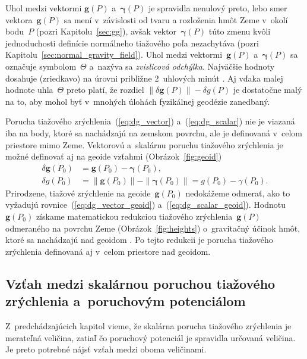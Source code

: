 \documentclass[a4paper, 12pt]{book}
\let\vec\mathbf
\begin{document}
Uhol medzi vektormi $\vec g(P)$ a~$\boldsymbol{\gamma}(P)$ je spravidla 
nenulový preto, lebo smer vektora~$\vec g(P)$ sa mení v~závislosti od tvaru 
a rozloženia hmôt Zeme v~okolí bodu~$P$ (pozri Kapitolu~\ref{sec:gg}), avšak 
vektor~$\boldsymbol \gamma(P)$ túto zmenu kvôli jednoduchosti definície 
normálneho tiažového poľa nezachytáva (pozri 
Kapitolu~\ref{sec:normal_gravity_field}).  Uhol medzi vektormi~$\vec g(P)$ 
a~$\boldsymbol \gamma(P)$ sa označuje symbolom~$\Theta$ a~nazýva sa 
\emph{zvislicová odchýlka}.  Najväčšie hodnoty dosahuje (zriedkavo) na úrovni 
približne 2~uhlových minút \parencite{GGMplus}.  Aj vďaka malej hodnote 
uhla~$\Theta$ preto platí, že rozdiel $\| \delta \vec g(P) \| - \delta g(P)$ je 
dostatočne malý na to, aby mohol byť v~mnohých úlohách fyzikálnej geodézie 
zanedbaný.

Porucha tiažového zrýchlenia~(\ref{eq:dg_vector}) a~(\ref{eq:dg_scalar}) nie je 
viazaná iba na body, ktoré sa nachádzajú na zemskom povrchu, ale je definovaná 
v~celom priestore mimo Zeme.  Vektorovú a~skalárnu poruchu tiažového zrýchlenia 
je možné definovať aj na geoide vzťahmi (Obrázok~\ref{fig:geoid})
%
\begin{align}
\label{eq:dg_vector_geoid}
\delta \vec g(P_0) &= \vec g(P_0) - \boldsymbol \gamma(P_0){,}\\
%
\label{eq:dg_scalar_geoid}
\delta g(P_0) &= \| \vec g(P_0) \| - \| \boldsymbol \gamma(P_0) \| = g(P_0) 
- \gamma(P_0){.}
\end{align}
%
Prirodzene, tiažové zrýchlenie na geoide~$\vec g(P_0)$ nedokážeme odmerať, ako 
to vyžadujú rovnice~(\ref{eq:dg_vector_geoid}) a~(\ref{eq:dg_scalar_geoid}).  
Hodnotu~$\vec g(P_0)$ získame matematickou redukciou tiažového zrýchlenia~$\vec 
g(P)$ odmeraného na povrchu Zeme (Obrázok~\ref{fig:heights}) o~gravitačný 
účinok hmôt, ktoré sa nachádzajú nad geoidom \parencite[pozri][]{Janak2006}.  
Po tejto redukcii je porucha tiažového zrýchlenia definovaná aj v~celom 
priestore nad geoidom.


\subsection{Vzťah medzi skalárnou poruchou tiažového zrýchlenia a~poruchovým 
potenciálom}

Z~predchádzajúcich kapitol vieme, že skalárna porucha tiažového zrýchlenia je 
merateľná veličina, zatiaľ čo poruchový potenciál je spravidla určovaná 
veličina.  Je preto potrebné nájsť vzťah medzi oboma veličinami.
\end{document}
